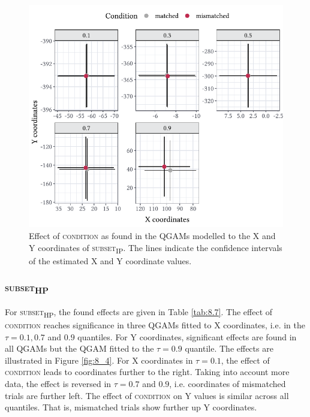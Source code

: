 \begin{figure}
    \centering
    \includegraphics[]{figures/fig8.3.pdf}
    \caption{Effect of \textsc{condition} as found in the QGAMs modelled to the X and Y coordinates of \textsc{subset\textsubscript{IP}}. The lines indicate the confidence intervals of the estimated X and Y coordinate values.}
    \label{fig:8_3}
\end{figure}

\subsubsection{\textsc{subset\textsubscript{HP}}}\label{section08_2_2_2}

For \textsc{subset\textsubscript{HP}}, the found effects are given in Table \ref{tab:8.7}. The effect of \textsc{condition} reaches significance in three QGAMs fitted to X coordinates, i.e. in the $\tau=0.1,0.7$ and $0.9$ quantiles. For Y coordinates, significant effects are found in all QGAMs but the QGAM fitted to the $\tau=0.9$ quantile. The effects are illustrated in Figure \ref{fig:8_4}. For X coordinates in $\tau=0.1$, the effect of \textsc{condition} leads to coordinates further to the right. Taking into account more data, the effect is reversed in $\tau=0.7$ and $0.9$, i.e. coordinates of mismatched trials are further left. The effect of \textsc{condition} on Y values is similar across all quantiles. That is, mismatched trials show further up Y coordinates.

